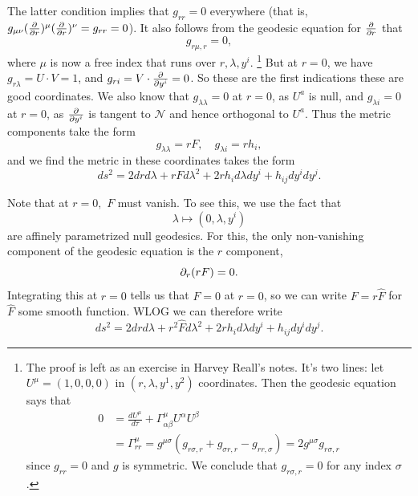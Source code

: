 The latter condition implies that $g_{rr}=0$ everywhere (that is, $g_{\mu\nu}(\P{}{r})^\mu (\P{}{r})^\nu = g_{rr}=0$). It also follows from the geodesic equation for $\P{}{r}$ that
\begin{equation}
    g_{r\mu,r}=0,
\end{equation}
where $\mu$ is now a free index that runs over $r,\lambda,y^i$.%
    \footnote{The proof is left as an exercise in Harvey Reall's notes. It's two lines: let $U^\mu=(1,0,0,0)$ in $(r,\lambda,y^1,y^2)$ coordinates. Then the geodesic equation says that
    \begin{align*}
        0&=\frac{d U^\mu}{d\tau} + \Gamma^\mu_{\alpha\beta} U^\alpha U^\beta\\
            &=\Gamma^\mu_{rr} = g^{\mu\sigma}(g_{r\sigma,r}+ g_{\sigma r,r} - g_{rr,\sigma}) = 2g^{\mu\sigma}g_{r\sigma,r}
    \end{align*}
    since $g_{rr}=0$ and $g$ is symmetric. We conclude that $g_{r\sigma,r}=0$ for any index $\sigma$.
    }
%
But at $r=0$, we have $g_{r\lambda}=U\cdot V = 1$, and $g_{ri}=V\cdot \P{}{y^i}=0$.
So these are the first indications these are good coordinates. We also know that $g_{\lambda\lambda}=0$ at $r=0$, as $U^a$ is null, and $g_{\lambda i}=0$ at $r=0$, as $\P{}{y^i}$ is tangent to $\mathcal{N}$ and hence orthogonal to $U^a$. Thus the metric components take the form
\begin{equation}
    g_{\lambda\lambda}= rF, \quad g_{\lambda i} = r h_i,
\end{equation}
and we find the metric in these coordinates takes the form
\begin{equation}
    ds^2 = 2drd\lambda +rF d\lambda^2 +2rh_i d\lambda dy^i + h_{ij} dy^i dy^j.
\end{equation}

Note that at $r=0,$ $F$ must vanish. To see this, we use the fact that
\begin{equation}
     \lambda\mapsto (0,\lambda,y^i)
\end{equation}
are affinely parametrized null geodesics. For this, the only non-vanishing component of the geodesic equation is the $r$ component,
\begin{equation}
    \p_r (rF)=0.
\end{equation}
Integrating this at $r=0$ tells us that $F=0$ at $r=0$, so we can write $F=r\hat F$ for $\hat F$ some smooth function. WLOG we can therefore write
\begin{equation}
    ds^2 = 2drd\lambda +r^2 \hat F d\lambda^2 +2rh_i d\lambda dy^i + h_{ij} dy^i dy^j.
\end{equation}

